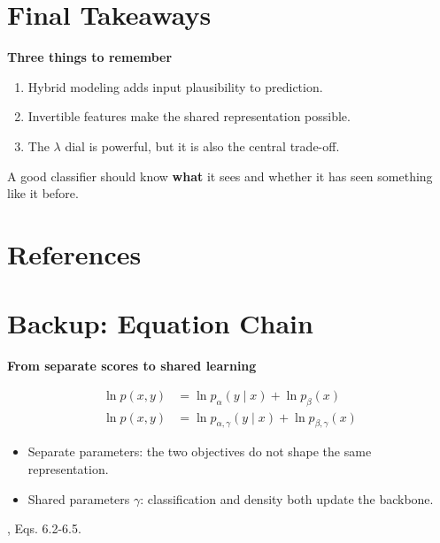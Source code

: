 \documentclass[fleqn,compress,utf8,aspectratio=169,t]{beamer}
\makeatletter
\newcommand{\mainclaim}[1]{%
  {\Large\bfseries #1\par}
}
\newcommand{\quietsource}[1]{%
  \vfill{\scriptsize\color{lmu@lightgray}#1\par}
}
\newcommand{\keyword}[1]{\textbf{\color{lmu@green}#1}}
\makeatother
\begin{document}
\section{Final Takeaways}
\begin{frame}
  \vspace{0.45cm}
  \mainclaim{Three things to remember}

  \vspace{0.65cm}
  \begin{enumerate}
    \item Hybrid modeling adds input plausibility to prediction.
    \item Invertible features make the shared representation possible.
    \item The \(\lambda\) dial is powerful, but it is also the central trade-off.
  \end{enumerate}

  \vspace{0.7cm}
  \centering
  A good classifier should know \keyword{what} it sees and whether it has seen something like it before.
\end{frame}


\appendix

\section{References}
\begin{frame}
  \printbibliography
\end{frame}

\section{Backup: Equation Chain}
\begin{frame}[noframenumbering]
  \mainclaim{From separate scores to shared learning}

  \vspace{0.25cm}
  \begin{align*}
    \ln p(x,y)
      &= \ln p_\alpha(y\mid x)+\ln p_\beta(x)\\[0.25cm]
    \ln p(x,y)
      &= \ln p_{\alpha,\gamma}(y\mid x)+\ln p_{\beta,\gamma}(x)
  \end{align*}

  \vspace{0.4cm}
  \begin{itemize}
    \item Separate parameters: the two objectives do not shape the same representation.
    \item Shared parameters \(\gamma\): classification and density both update the backbone.
  \end{itemize}

  \quietsource{\textcite{tomczak2024deep}, Eqs. 6.2-6.5.}
\end{frame}
\end{document}
